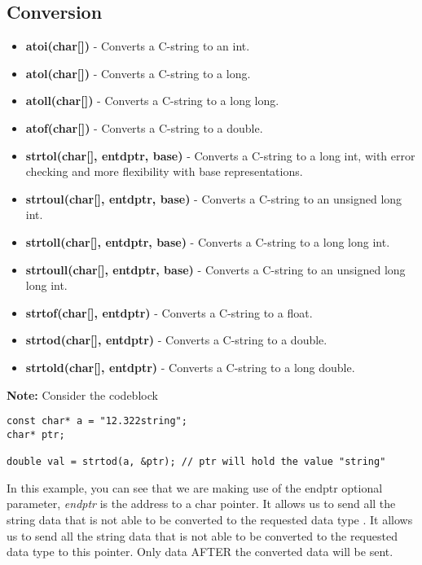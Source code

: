 \documentclass{report}
\begin{document}
    \subsection{Conversion}
    \begin{itemize}
        \item \textbf{atoi(char[])} - Converts a C-string to an int.
        \item \textbf{atol(char[])} - Converts a C-string to a long.
        \item \textbf{atoll(char[])} - Converts a C-string to a long long.
        \item \textbf{atof(char[])} - Converts a C-string to a double.
        \item \textbf{strtol(char[], entdptr, base)} - Converts a C-string to a long int, with error checking and more flexibility with base representations.
        \item \textbf{strtoul(char[], entdptr, base)} - Converts a C-string to an unsigned long int.
        \item \textbf{strtoll(char[], entdptr, base)} - Converts a C-string to a long long int.
        \item \textbf{strtoull(char[], entdptr, base)} - Converts a C-string to an unsigned long long int.
        \item \textbf{strtof(char[], entdptr)} - Converts a C-string to a float.
        \item \textbf{strtod(char[], entdptr)} - Converts a C-string to a double.
        \item \textbf{strtold(char[], entdptr)} - Converts a C-string to a long double.
    \end{itemize}
    \bigbreak \noindent 
    \textbf{Note:} Consider the codeblock
    \begin{verbatim}
const char* a = "12.322string";
char* ptr;

double val = strtod(a, &ptr); // ptr will hold the value "string"
    \end{verbatim}
    \bigbreak \noindent 
    In this example, you can see that we are making use of the endptr optional parameter, \textit{endptr} is the address to a char pointer. It allows us to send all the string data that is not able to be converted to the requested data type . It allows us to send all the string data that is not able to be converted to the requested data type to this pointer. Only data AFTER the converted data will be sent.

    
\end{document}
